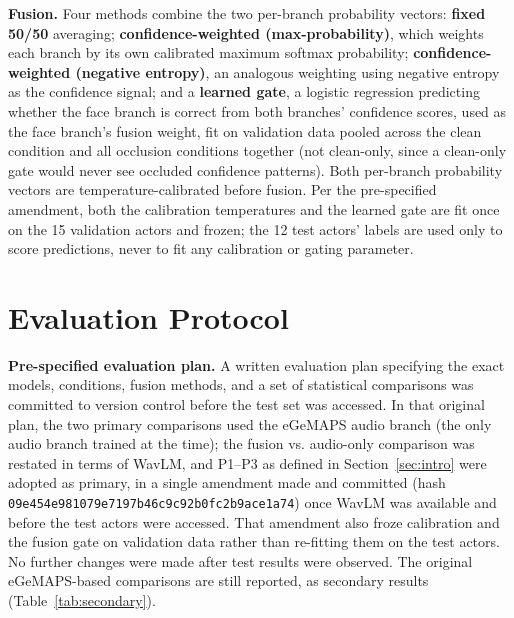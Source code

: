 \documentclass[10pt]{article}
\begin{document}
\textbf{Fusion.} Four methods combine the two per-branch probability vectors: \textbf{fixed 50/50} averaging;
\textbf{confidence-weighted (max-probability)}, which weights each branch by its own calibrated maximum
softmax probability; \textbf{confidence-weighted (negative entropy)}, an analogous weighting using negative
entropy as the confidence signal; and a \textbf{learned gate}, a logistic regression predicting whether the
face branch is correct from both branches' confidence scores, used as the face branch's fusion weight,
fit on validation data pooled across the clean condition and all occlusion conditions together (not
clean-only, since a clean-only gate would never see occluded confidence patterns).
Both per-branch probability vectors are temperature-calibrated before fusion. Per the pre-specified
amendment, both the calibration temperatures and the learned gate are fit once on the 15 validation
actors and frozen; the 12 test actors' labels are used only to score predictions, never to fit any
calibration or gating parameter.

\section{Evaluation Protocol}
\label{sec:evalprotocol}

\textbf{Pre-specified evaluation plan.} A written evaluation plan specifying the exact models, conditions,
fusion methods, and a set of statistical comparisons was committed to version control before the test
set was accessed. In that original plan, the two primary comparisons used the eGeMAPS audio branch (the
only audio branch trained at the time); the fusion vs. audio-only comparison was restated in terms of
WavLM, and P1--P3 as defined in Section~\ref{sec:intro} were adopted as primary, in a single amendment made and
committed (hash \texttt{09e454e981079e7197b46c9c92b0fc2b9ace1a74}) once WavLM was available and before the test
actors were accessed. That amendment also froze calibration and the fusion gate on validation data
rather than re-fitting them on the test actors. No further changes were made after test results were
observed. The original eGeMAPS-based comparisons are still reported, as secondary results (Table~\ref{tab:secondary}).
\end{document}
